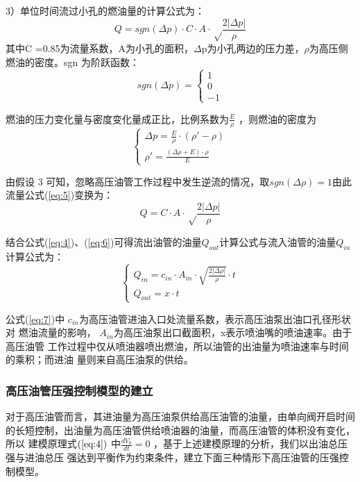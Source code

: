 \documentclass{cumcmthesis}
\begin{document}
 3）单位时间流过小孔的燃油量的计算公式\textsuperscript{\cite{bib:five}}为：
 \begin{equation}
 Q=sgn(\Delta p)\cdot C\cdot A\cdot\sqrt\frac{{2\lvert \Delta p \rvert}}{\rho}\label{eq:5}
 \end{equation}
其中C =0.85为流量系数，A为小孔的面积，$\Delta$p为小孔两边的压力差，$\rho$为高压侧
燃油的密度。sgn 为阶跃函数： 
 \begin{equation*}
sgn(\Delta p)=\begin{cases}
1\\
0\\
-1
\end{cases}
\end{equation*}

燃油的压力变化量与密度变化量成正比，比例系数为$\frac{E}{\rho}$
，则燃油的密度为 
 \begin{equation*}
\begin{cases}
\Delta p=\frac{E}{\rho}\cdot\left(\rho'-\rho\right)\\
\rho'=\frac{\left(\Delta \rho+E\right)\cdot\rho}{E}
\end{cases}
\end{equation*}


由假设 3 可知，忽略高压油管工作过程中发生逆流的情况，取$sgn(\Delta \rho)=1$由此流量公式(\ref{eq:5})变换为：
 \begin{equation}
 Q=C\cdot A\cdot\sqrt\frac{{2\lvert \Delta p \rvert}}{\rho}\label{eq:6}
 \end{equation}

结合公式(\ref{eq:4})、(\ref{eq:6})可得流出油管的油量$Q_{out}$计算公式与流入油管的油量$Q_{in}$计算公式为： 
\begin{equation}
	\begin{cases}
	Q_{in}=c_{in}\cdot A_{in}\cdot \sqrt{\frac{2\lvert \Delta \rho \rvert}{\rho}}\cdot t \\
	Q_{out}=x\cdot t
	\end{cases}\label{eq:7}
\end{equation}

公式(\ref{eq:7})中 $c_{in}$为高压油管进油入口处流量系数，表示高压油泵出油口孔径形状对 燃油流量的影响， $A_{in}$为高压油泵出口截面积，x表示喷油嘴的喷油速率。由于高压油管 工作过程中仅从喷油器喷出燃油，所以油管的出油量为喷油速率与时间的乘积；而进油 量则来自高压油泵的供给。

\subsubsection{高压油管压强控制模型的建立}
对于高压油管而言，其进油量为高压油泵供给高压油管的油量，由单向阀开启时间 的长短控制，出油量为高压油管供给喷油器的油量，而高压油管的体积没有变化，所以
建模原理式$\left(\ref{eq:4}\right)$ 中$\frac{dV_{0}}{dt}=0$
，基于上述建模原理的分析，我们以出油总压强与进油总压
强达到平衡作为约束条件，建立下面三种情形下高压油管的压强控制模型。
\end{document}
